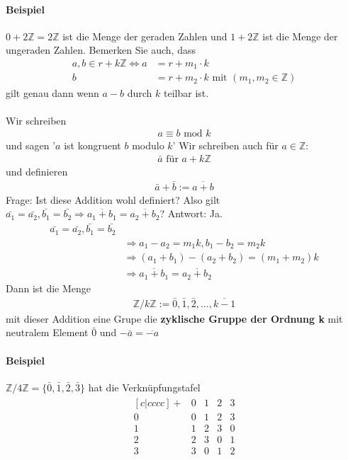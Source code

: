 \documentclass[11pt]{report}
\newcommand*\Zb[1] {\mathbb{#1}}
\newcommand*\f[1] {\textbf{#1}}
\begin{document}
\paragraph{Beispiel}
$0+2\Zb{Z}= 2 \Zb{Z}$ ist die Menge der geraden Zahlen und $1 + 2 \Zb{Z}$ ist die Menge der ungeraden Zahlen.
Bemerken Sie auch, dass 
\begin{align}
 a, b \in r + k \Zb{Z} \Leftrightarrow a &= r + m_1 \cdot k \\
                       b &= r+m_2 \cdot k \text{ mit } (m_1, m_2 \in \Zb{Z})
\end{align}
gilt genau dann wenn $a-b$ durch $k$ teilbar ist.\\\\
Wir schreiben 
\begin{align}
 a \equiv b \textrm{ mod } k
\end{align}
und sagen '$a$ ist kongruent $b$ modulo $k$'
Wir schreiben auch für $a \in \Zb{Z}$:
\begin{align}
 \bar{a} \textrm{ für } a+k\Zb{Z}
\end{align}
und definieren
\begin{align}
 \bar{a} + \bar{b} := \overline{a+b}
\end{align}
Frage: Ist diese Addition wohl definiert?
Also gilt $\bar{a_1} = \bar{a_2}, \bar{b_1} = \bar{b_2} \Rightarrow \overline{a_1+b_1} = \overline{a_2 + b_2}$?
Antwort: Ja.
\begin{align}
\bar{a_1} = \bar{a_2}, \bar{b_1} = \bar{b_2} \\
&\Rightarrow a_1 - a_2 = m_1 k, b_1 - b_2 = m_2 k\\
&\Rightarrow (a_1+b_1)-(a_2+b_2) = (m_1 + m_2)k \\
&\Rightarrow \overline{a_1+b_1} = \overline{a_2+b_2} 
\end{align}
Dann ist die Menge
\begin{align}
 \Zb{Z} / k\Zb{Z} := {\bar{0}, \bar{1}, \bar{2}, ..., \overline{k-1}}
\end{align}
mit dieser Addition eine Grupe die \f{zyklische Gruppe der Ordnung k} mit neutralem Element $\bar{0}$ und $-\bar{a} = \overline{-a}$

\paragraph{Beispiel} $\Zb{Z} / 4\Zb{Z} = \{\bar{0}, \bar{1}, \bar{2}, \bar{3}\}$
hat die Verknüpfungstafel
\begin{align}
 \begin{matrix}[c|cccc]
 + & 0 & 1 & 2 & 3 \\
\hline
0 & 0 & 1 & 2 & 3\\
1 & 1 & 2 & 3 & 0\\
2 & 2 & 3 & 0 & 1 \\
3 & 3 & 0 & 1 & 2
\end{matrix}
\end{align}
\end{document}
